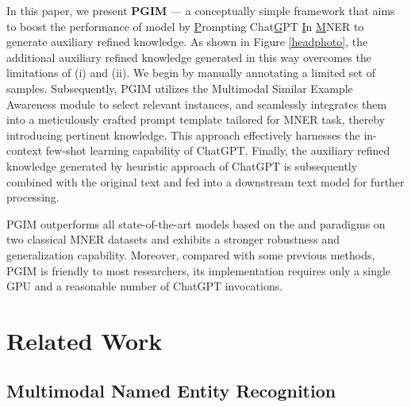 \documentclass[11pt]{article}
\begin{document}
In this paper, we present \textbf{PGIM} --- a conceptually simple framework that aims to boost the performance of model by \underline{P}rompting Chat\underline{G}PT \underline{I}n \underline{M}NER to generate auxiliary refined knowledge. 
As shown in Figure \ref{headphoto}, the additional auxiliary refined knowledge generated in this way overcomes the limitations of (i) and (ii). 
We begin by manually annotating a limited set of samples. Subsequently, PGIM utilizes the Multimodal Similar Example Awareness module to select relevant instances, and seamlessly integrates them into a meticulously crafted prompt template tailored for MNER task, thereby introducing pertinent knowledge. This approach effectively harnesses the in-context few-shot learning capability of ChatGPT. Finally, the auxiliary refined knowledge generated by heuristic approach of ChatGPT is subsequently combined with the original text and fed into a downstream text model for further processing. 

PGIM outperforms all state-of-the-art models based on the  and  paradigms on two classical MNER datasets and exhibits a stronger robustness and generalization capability. Moreover, compared with some previous methods, PGIM is friendly to most researchers, its implementation requires only a single GPU and a reasonable number of ChatGPT invocations.


\section{Related Work}
\subsection{Multimodal Named Entity Recognition}
\end{document}
